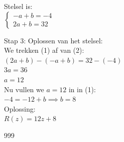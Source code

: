 \documentclass[a4paper]{article}
\begin{document}
Stelsel is:\\

\(
\left\{
\begin{array}{l}
-a + b = -4 \\
2a + b = 32
\end{array}
\right.
\)

Stap 3: Oplossen van het stelsel:\\

We trekken (1) af van (2):\\

$(2a + b) - (-a + b) = 32 - (-4)$\\

$3a = 36$\\

$a = 12$\\

Nu vullen we $a = 12$ in in (1):\\

$-4 = -12 + b \implies b = 8$\\

Oplossing: \\

$R(z) = 12z + 8$\\


\begin{thebibliography}{999}
\end{thebibliography}
\end{document}

